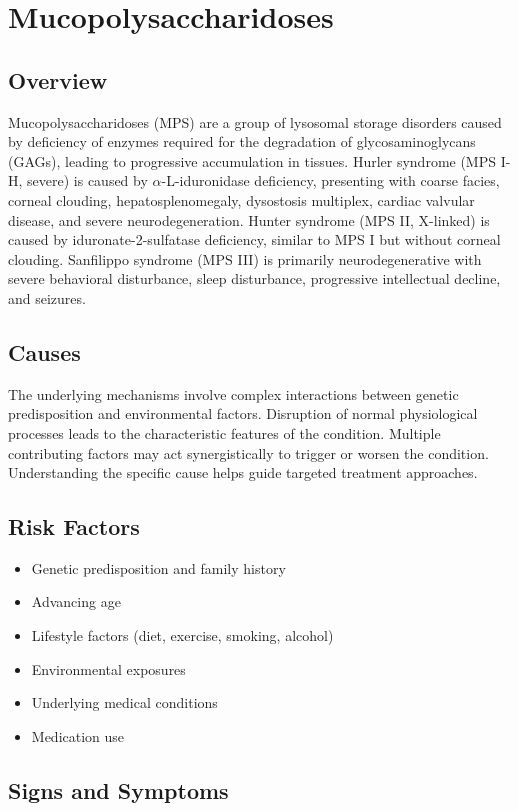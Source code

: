 \chapter{Mucopolysaccharidoses}
\label{sec:Mucopolysaccharidoses}

\section{Overview}
Mucopolysaccharidoses (MPS) are a group of lysosomal storage disorders caused by deficiency of enzymes required for the degradation of glycosaminoglycans (GAGs), leading to progressive accumulation in tissues. Hurler syndrome (MPS I-H, severe) is caused by $\alpha$-L-iduronidase deficiency, presenting with coarse facies, corneal clouding, hepatosplenomegaly, dysostosis multiplex, cardiac valvular disease, and severe neurodegeneration. Hunter syndrome (MPS II, X-linked) is caused by iduronate-2-sulfatase deficiency, similar to MPS I but without corneal clouding. Sanfilippo syndrome (MPS III) is primarily neurodegenerative with severe behavioral disturbance, sleep disturbance, progressive intellectual decline, and seizures.
\section{Causes}
The underlying mechanisms involve complex interactions between genetic predisposition and environmental factors. Disruption of normal physiological processes leads to the characteristic features of the condition. Multiple contributing factors may act synergistically to trigger or worsen the condition. Understanding the specific cause helps guide targeted treatment approaches.
\section{Risk Factors}


\begin{itemize}[noitemsep]
  \item Genetic predisposition and family history
  \item Advancing age
  \item Lifestyle factors (diet, exercise, smoking, alcohol)
  \item Environmental exposures
  \item Underlying medical conditions
  \item Medication use
\end{itemize}
\section{Signs and Symptoms}

